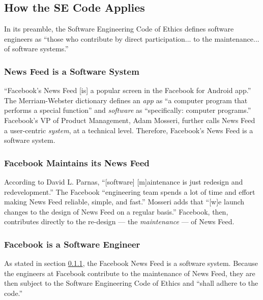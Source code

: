 
\subsection{How the SE Code Applies}

\par In its preamble, the Software Engineering Code of Ethics defines software engineers as ``those who contribute by direct participation... to the maintenance... of software systems.''\cite{se_code} 

\subsubsection{News Feed is a Software System}
\label{se_system}

\par ``Facebook's News Feed [is] a popular screen in the Facebook for Android app.'' \cite{fb_nf_android} The Merriam-Webster dictionary defines an \emph{app} as ``a computer program that performs a special function'' \cite{merriam_webster} and \emph{software} as ``specifically: computer programs.'' \cite{merriam_webster} Facebook's VP of Product Management, Adam Mosseri, further calls News Feed a user-centric \emph{system}, at a technical level. \cite{fb_nf_works} Therefore, Facebook's News Feed is a software system.

\subsubsection{Facebook Maintains its News Feed}
\label{se_maintenance}

\par According to David L. Parnas, ``[software] [m]aintenance is just redesign and redevelopment.'' \cite{parnas} The Facebook ``engineering team spends a lot of time and effort making News Feed reliable, simple, and fast.'' \cite{fb_nf_faster} Mosseri adds that ``[w]e launch changes to the design of News Feed on a regular basis.'' \cite{fb_nf_works} Facebook, then, contributes directly to the re-design --- the \emph{maintenance} --- of News Feed.

\subsubsection{Facebook is a Software Engineer}

\par As stated in section \ref{se_system}, the Facebook News Feed is a software system. Because the engineers at Facebook contribute to the maintenance of News Feed, they are then subject to the Software Engineering Code of Ethics and ``shall adhere to the code.'' \cite{se_code}